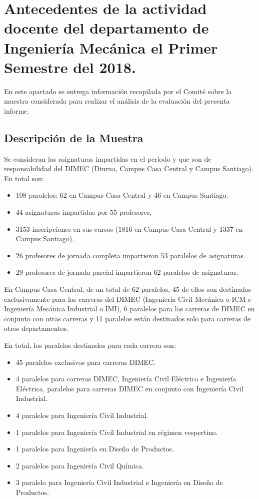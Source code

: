 \documentclass[12pt]{article}
\begin{document}

\section{Antecedentes de la actividad docente del departamento de Ingeniería Mecánica el Primer Semestre del 2018.}
\begin{text}
En este apartado se entrega información recopilada por el Comité sobre la muestra considerada para realizar el análisis de la evaluación del presenta informe. 
\par
\subsection{Descripción de la Muestra}
Se consideran las asignaturas impartidas en el período y que son de responsabilidad del DIMEC (Diurna, Campus Casa Central y Campus Santiago). En total son: 
\end{text}
\begin{itemize}
    \item 108 paralelos: 62 en Campus Casa Central y 46 en Campus Santiago.
    \item 44 asignaturas impartidas por 55 profesores,
    \item 3153 inscripciones en sus cursos (1816 en Campus Casa Central y 1337 en Campus Santiago).
    \item 26 profesores de jornada completa impartieron 53 paralelos de asignaturas.
    \item 29 profesores de jornada parcial impartieron 62 paralelos de asignaturas.
\end{itemize}
\begin{text}
\indent 
En Campus Casa Central, de un total de 62 paralelos, 45 de ellos son destinados exclusivamente para las carreras del DIMEC (Ingeniería Civil Mecánica o ICM e Ingeniería Mecánica Industrial o IMI), 6 paralelos para las carreras de DIMEC en conjunto con otras carreras y 11 paralelos están destinados solo para carreras de otros departamentos. \par
En total, los paralelos destinados para cada carrera son:
\end{text}
\begin{itemize}
    \item 45 paralelos exclusivos para carreras DIMEC. 
    \item 4 paralelos para carreras DIMEC, Ingeniería Civil Eléctrica e Ingeniería Eléctrica.
     paralelos para carreras DIMEC en conjunto con Ingeniería Civil Industrial.
    \item 4 paralelos para Ingeniería Civil Industrial.  
    \item 1 paralelos para Ingeniería Civil Industrial en régimen vespertino.
    \item 1 paralelos para Ingeniería en Diseño de Productos. 
    \item 2 paralelos para Ingeniería Civil Química.
    \item 3 paralelo para Ingeniería Civil Industrial e Ingeniería en Diseño de Productos.
\end{itemize}
\end{document}
